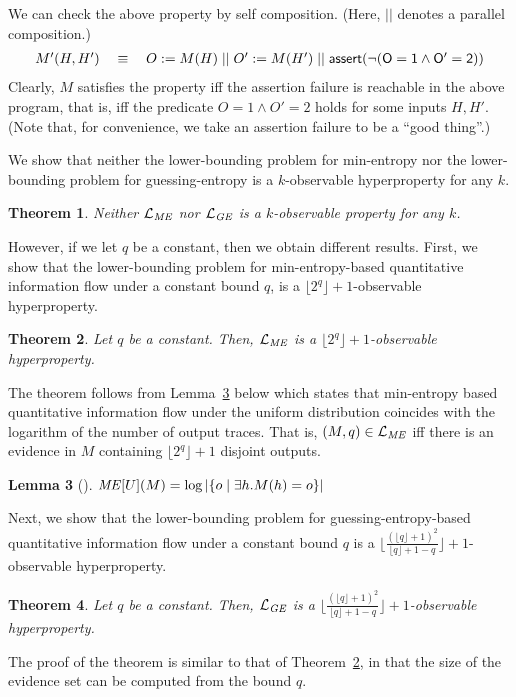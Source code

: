 \documentclass[]{eptcs}
\newcommand{\aset}[1]{\{{#1}\}}
\newtheorem{theorem}{Theorem}[section]
\newtheorem{lemma}[theorem]{Lemma}
\begin{document}
We can check the above property by self composition.  (Here, $||$
denotes a parallel composition.)
\[
\begin{array}{rcl}
  M'(H,H')&\;\equiv \;& O:=M(H)\; ||\; O':=M(H') \;||\;\sf{assert}(\neg(O=1\wedge O'=2))
\end{array}
\]
Clearly, $M$ satisfies the property iff the assertion failure is
reachable in the above program, that is, iff the predicate $O=1 \wedge
O'=2$ holds for some inputs $H, H'$.  (Note that, for convenience, we
take an assertion failure to be a ``good thing''.)

We show that neither the lower-bounding problem for min-entropy nor
the lower-bounding problem for guessing-entropy is a $k$-observable
hyperproperty for any $k$.
\begin{theorem}
\label{thm:LMELGEnkl}
  Neither $\mathcal{L}_{\it ME}$ nor $\mathcal{L}_{\it GE}$ is a
  $k$-observable property for any $k$.
\end{theorem}

However, if we let $q$ be a constant, then we obtain different
results.  First, we show that the lower-bounding problem for
min-entropy-based quantitative information flow under a constant bound
$q$, is a $\lfloor 2^q\rfloor +1$-observable hyperproperty.
\begin{theorem}
\label{thm:lmel}
Let $q$ be a constant.  Then, $\mathcal{L}_{\it ME}$ is a $\lfloor
2^q\rfloor +1$-observable hyperproperty.
\end{theorem}
The theorem follows from Lemma~\ref{lem:melog} below which states that
min-entropy based quantitative information flow under the uniform
distribution coincides with the logarithm of the number of output
traces.  That is, $(M,q)\in \mathcal{L}_{\it ME}$ iff there is an
evidence in $M$ containing $\lfloor 2^q\rfloor +1$ disjoint outputs.
\begin{lemma}[\cite{smith09}]
\label{lem:melog}
${\it ME}[U](M)=\log |\aset{o\mid \exists h. M(h)=o}|$
\end{lemma}

Next, we show that the lower-bounding problem for
guessing-entropy-based quantitative information flow under a constant
bound $q$ is a $\lfloor \frac{(\lfloor q\rfloor +1)^2}{\lfloor
  q\rfloor +1 -q}\rfloor +1$-observable hyperproperty.
\begin{theorem}
\label{thm:lgel}
  Let $q$ be a constant.  Then, $\mathcal{L}_{\it GE}$ is a $\lfloor
  \frac{(\lfloor q\rfloor +1)^2}{\lfloor q\rfloor +1 -q}\rfloor
  +1$-observable hyperproperty.
\end{theorem}
The proof of the theorem is similar to that of Theorem~\ref{thm:lmel},
in that the size of the evidence set can be computed from the bound
$q$.
\end{document}
